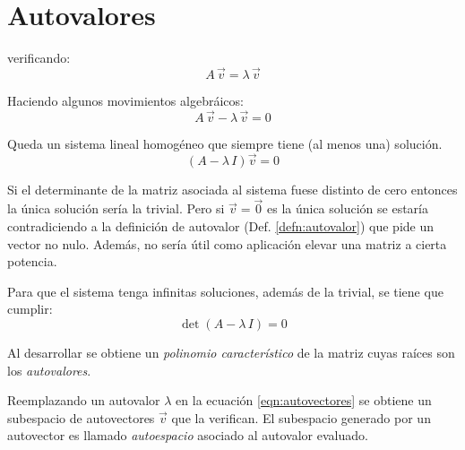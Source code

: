 \chapter{Autovalores}

\begin{mdframed}[style=DefinitionFrame]
    \begin{defn}
        \label{defn:autovalor}
    \end{defn}
     verificando:
    \begin{equation*}
        A \, \Vec{v} = \lambda \, \Vec{v}
    \end{equation*}
\end{mdframed}

Haciendo algunos movimientos algebráicos:
\begin{equation*}
    A \, \Vec{v} - \lambda \, \Vec{v} = 0
\end{equation*}

Queda un sistema lineal homogéneo que siempre tiene (al menos una) solución.
\begin{equation}
    \left( A - \lambda \, I \right) \Vec{v} = 0
    \label{eqn:autovectores}
\end{equation}

Si el determinante de la matriz asociada al sistema fuese distinto de cero entonces la única solución sería la trivial.
Pero si $\Vec{v}=\Vec{0}$ es la única solución se estaría contradiciendo a la definición de autovalor (Def. \ref{defn:autovalor}) que pide un vector no nulo.
Además, no sería útil como aplicación elevar una matriz a cierta potencia.

Para que el sistema tenga infinitas soluciones, además de la trivial, se tiene que cumplir:
\begin{equation*}
    \operatorname{det} \left( A - \lambda \, I \right) = 0
\end{equation*}

Al desarrollar se obtiene un \emph{polinomio característico} de la matriz cuyas raíces son los \emph{autovalores}.

Reemplazando un autovalor $\lambda$ en la ecuación \ref{eqn:autovectores} se obtiene un subespacio de autovectores $\Vec{v}$ que la verifican.
El subespacio generado por un autovector es llamado \emph{autoespacio} asociado al autovalor evaluado.

